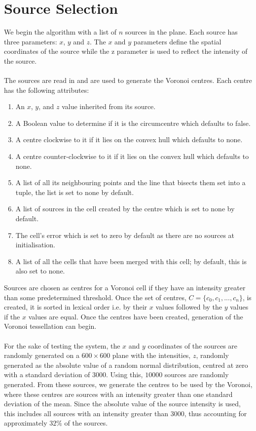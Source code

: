 \section{Source Selection}\label{sec:design:source}
We begin the algorithm with a list of $n$ sources in the plane. Each source has three parameters: $x$, $y$ and $z$. The $x$ and $y$ parameters define the spatial coordinates of the source while the z parameter is used to reflect the intensity of the source.
\\
\\
The sources are read in and are used to generate the Voronoi centres. Each centre has the following attributes:
\begin{enumerate}
\item An $x$, $y$, and $z$ value inherited from its source.
\item A Boolean value to determine if it is the circumcentre which defaults to false.
\item A centre clockwise to it if it lies on the convex hull which defaults to none.
\item A centre counter-clockwise to it if it lies on the convex hull which defaults to none.
\item A list of all its neighbouring points and the line that bisects them set into a tuple, the list is set to none by default.
\item A list of sources in the cell created by the centre which is set to none by default.
\item The cell's error which is set to zero by default as there are no sources at initialisation.
\item A list of all the cells that have been merged with this cell; by default, this is also set to none.
\end{enumerate} 
Sources are chosen as centres for a Voronoi cell if they have an intensity greater than some predetermined threshold. Once the set of centres, $C= \{c_0,c_1,...,c_n\}$, is created, it is sorted in lexical order i.e. by their $x$ values followed by the $y$ values if the $x$ values are equal. Once the centres have been created, generation of the Voronoi tessellation can begin.
\\
\\
For the sake of testing the system, the $x$ and $y$ coordinates of the sources are randomly generated on a $600 \times 600$ plane with the intensities, $z$, randomly generated as the absolute value of a random normal distribution, centred at zero with a standard deviation of $3000$. Using this, $10000$ sources are randomly generated. From these sources, we generate the centres to be used by the Voronoi, where these centres are sources with an intensity greater than one standard deviation of the mean. Since the absolute value of the source intensity is used, this includes all sources with an intensity greater than 3000, thus accounting for approximately $32\%$ of the sources.

